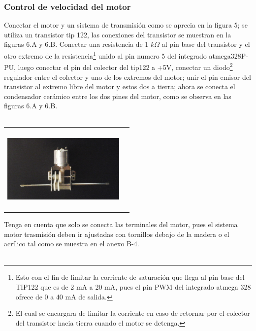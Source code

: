 \documentclass[12]{article}
\newenvironment{Figure}
{\par\medskip\noindent\minipage{\linewidth}}
{\endminipage\par\medskip}
\begin{document}
\begin{multicols}{2}
\subsubsection{Control de velocidad del motor}
Conectar el motor y un sistema de transmisión como se aprecia en la figura 5; se utiliza un transistor tip\cite{TIP122} 122, las conexiones del transistor se muestran en la  figuras 6.A y 6.B.
\vspace{2cm}
Conectar una resistencia de 1 $k \Omega $ al pin base del transistor y el otro extremo de la resistencia\footnote{Esto con el fin de limitar la corriente de saturación que llega al pin  base del TIP122 que es de 2 mA a 20 mA, pues el pin PWM del integrado atmega 328 ofrece de 0 a 40 mA de salida.}  unido al pin numero 5 del integrado atmega328P-PU, luego conectar el pin del colector del tip122 a +5V, conectar un  diodo\footnote{El cual se encargara de limitar la corriente en caso de retornar por el colector del transistor hacia tierra cuando el motor se detenga.} regulador entre el colector y uno de los extremos del motor; unir el pin emisor del transistor  al extremo libre del motor y estos dos a tierra; ahora se conecta el condensador cerámico entre los dos pines del motor, como se observa en las  figuras 6.A y 6.B.\\\\
\begin{Figure}
\center
\begin{tabular}{|l|r|}
\hline
\\
\includegraphics[width=6cm, height=4cm]{img/transmision.png}  \\\\ \hline
\end{tabular}
\label{fig:g5}
\end{Figure}
\vspace{0.5 cm}
Tenga en cuenta que solo se conecta las terminales del motor, pues el sistema motor trasmisión deben ir ajustadas con tornillos debajo de la madera o el acrílico tal como se muestra en el anexo B-4.\\\\

\end{multicols}
\end{document}
